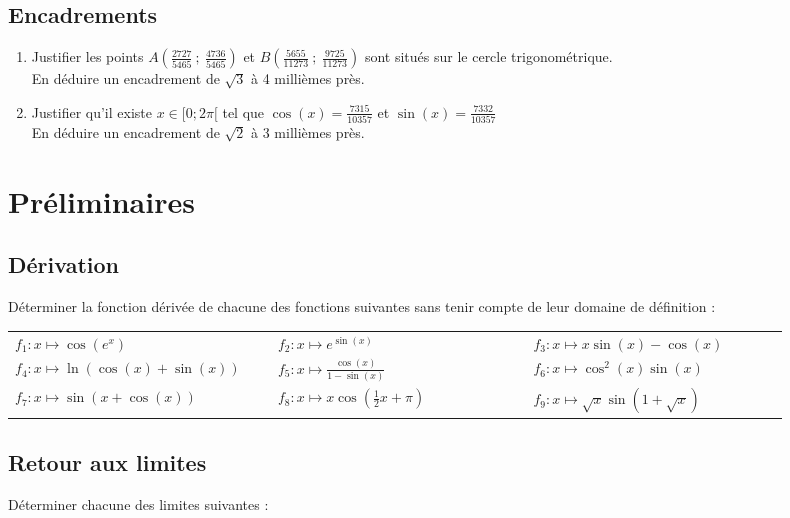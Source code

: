 \documentclass[oneside,12pt]{article}          %
\begin{document}
\subsection{Encadrements}
\begin{enumerate}\setlength{\itemsep}{1pt}
	\item Justifier les points $A\left(\frac{2727}{5465}~;~\frac{4736}{5465}\right)$ et $B\left(\frac{5655}{11273}~;~\frac{9725}{11273}\right)$ sont situés sur le cercle trigonométrique. \\
	En déduire un encadrement de $\sqrt{3}$ à 4 millièmes près.
	\item Justifier qu'il existe $x\in[0;2\pi[$ tel que $\cos(x)=\frac{7315}{10357}$ et $\sin(x)=\frac{7332}{10357}$\\
	En déduire un encadrement de $\sqrt2$ à 3 millièmes près.
\end{enumerate}



\section{Préliminaires}

\subsection{Dérivation}
Déterminer la fonction dérivée de chacune des fonctions suivantes sans tenir compte de leur domaine de définition :

\renewcommand{\arraystretch}{1.7}
\begin{tabular}{p{0.3\linewidth}p{0.3\linewidth}p{0.3\linewidth}}
	$f_1:x\mapsto \cos\left(e^x\right)$ & $f_2:x\mapsto e^{\sin(x)}$ & $f_3:x\mapsto x\sin(x)-\cos(x)$ \\
	$f_4:x\mapsto \ln(\cos(x)+\sin(x))$ & $f_5:x\mapsto \frac{\cos(x)}{1-\sin(x)}$ & $f_6:x\mapsto \cos^2(x)\sin(x)$ \\
	$f_7:x\mapsto \sin\left(x+\cos(x)\right)$ & $f_8:x\mapsto x\cos\left(\frac{1}{2}x+\pi\right)$ & $f_9:x\mapsto \sqrt{x}\sin\left(1+\sqrt{x}\right)$
\end{tabular}



\subsection{Retour aux limites}
Déterminer chacune des limites suivantes :
\end{document}
